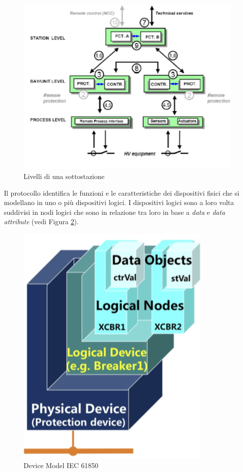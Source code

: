 \begin{figure}[h]%
	\centering
	\includegraphics[scale=0.400]{imgs/61850ls.png}
	\caption{Livelli di una sottostazione} \label{fig:61850ls}
\end{figure}


Il protocollo identifica le funzioni e le caratteristiche dei dispositivi fisici che si modellano in uno o più dispositivi logici. I dispositivi logici sono a loro volta suddivisi in nodi logici che sono in relazione tra loro in base a \emph{data} e \emph{data attribute} (vedi Figura \ref{fig:iec61850ln}).
\begin{figure}[h]
	\centering
	\includegraphics[scale=0.350]{imgs/iec61850ln.png}
	\caption{Device Model IEC 61850} \label{fig:iec61850ln}
\end{figure}

